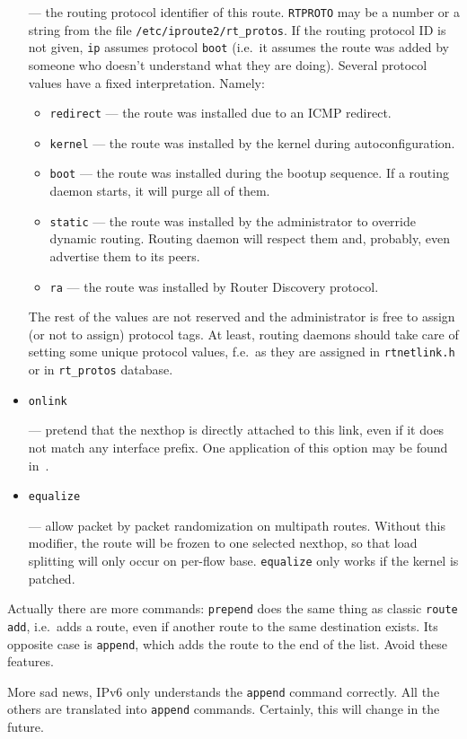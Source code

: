 \begin{itemize}
--- the routing protocol identifier of this route.
\verb|RTPROTO| may be a number or a string from the file
\verb|/etc/iproute2/rt_protos|. If the routing protocol ID is
not given, \verb|ip| assumes protocol \verb|boot| (i.e.\
it assumes the route was added by someone who doesn't
understand what they are doing). Several protocol values have a fixed interpretation.
Namely:
\begin{itemize}
\item \verb|redirect| --- the route was installed due to an ICMP redirect.
\item \verb|kernel| --- the route was installed by the kernel during
autoconfiguration.
\item \verb|boot| --- the route was installed during the bootup sequence.
If a routing daemon starts, it will purge all of them.
\item \verb|static| --- the route was installed by the administrator
to override dynamic routing. Routing daemon will respect them
and, probably, even advertise them to its peers.
\item \verb|ra| --- the route was installed by Router Discovery protocol.
\end{itemize}
The rest of the values are not reserved and the administrator is free
to assign (or not to assign) protocol tags. At least, routing
daemons should take care of setting some unique protocol values,
f.e.\ as they are assigned in \verb|rtnetlink.h| or in \verb|rt_protos|
database.


\item \verb|onlink|

--- pretend that the nexthop is directly attached to this link,
even if it does not match any interface prefix. One application of this
option may be found in~\cite{IP-TUNNELS}.

\item \verb|equalize|

--- allow packet by packet randomization on multipath routes.
Without this modifier, the route will be frozen to one selected
nexthop, so that load splitting will only occur on per-flow base.
\verb|equalize| only works if the kernel is patched.


\end{itemize}


\begin{NB}
  Actually there are more commands: \verb|prepend| does the same
  thing as classic \verb|route add|, i.e.\ adds a route, even if another
  route to the same destination exists. Its opposite case is \verb|append|,
  which adds the route to the end of the list. Avoid these
  features.
\end{NB}
\begin{NB}
  More sad news, IPv6 only understands the \verb|append| command correctly.
  All the others are translated into \verb|append| commands. Certainly,
  this will change in the future.
\end{NB}

